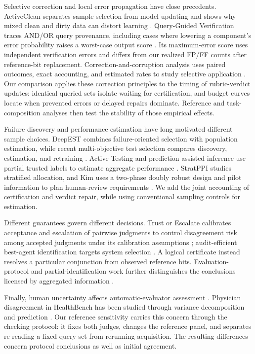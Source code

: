 \documentclass[10pt,letterpaper]{article}
\begin{document}
Selective correction and local error propagation have close precedents. ActiveClean separates sample selection from model updating and shows why mixed clean and dirty data can distort learning \citep{krishnan2016activeclean}. Query-Guided Verification traces AND/OR query provenance, including cases where lowering a component's error probability raises a worst-case output score \citep{schreiber2026queryguided}. Its maximum-error score uses independent verification errors and differs from our realized FP/FF counts after reference-bit replacement. Correction-and-corruption analysis uses paired outcomes, exact accounting, and estimated rates to study selective application \citep{reitich2026correction}. Our comparison applies these correction principles to the timing of rubric-verdict updates: identical queried sets isolate waiting for certification, and budget curves locate when prevented errors or delayed repairs dominate. Reference and task-composition analyses then test the stability of those empirical effects.

Failure discovery and performance estimation have long motivated different sample choices. DeepEST combines failure-oriented selection with population estimation, while recent multi-objective test selection compares discovery, estimation, and retraining \citep{guerriero2021deepest,zhang2026testselection}. Active Testing and prediction-assisted inference use partial trusted labels to estimate aggregate performance \citep{nguyen2018activetesting,chaganty2018price,angelopoulos2023ppi}. StratPPI studies stratified allocation, and Kim uses a two-phase doubly robust design and pilot information to plan human-review requirements \citep{fisch2024stratppi,kim2026humanreviews}. We add the joint accounting of certification and verdict repair, while using conventional sampling controls for estimation.

Different guarantees govern different decisions. Trust or Escalate calibrates acceptance and escalation of pairwise judgments to control disagreement risk among accepted judgments under its calibration assumptions \citep{jung2025trust}; audit-efficient best-agent identification targets system selection \citep{ao2026audits}. A logical certificate instead resolves a particular conjunction from observed reference bits. Evaluation-protocol and partial-identification work further distinguishes the conclusions licensed by aggregated information \citep{rao2026agreement,chen2026partial}.

Finally, human uncertainty affects automatic-evaluator assessment \citep{elangovan2025uncertainty}. Physician disagreement in HealthBench has been studied through variance decomposition and prediction \citep{borgohain2026disagreement}. Our reference sensitivity carries this concern through the checking protocol: it fixes both judges, changes the reference panel, and separates re-reading a fixed query set from rerunning acquisition. The resulting differences concern protocol conclusions as well as initial agreement.
\end{document}
